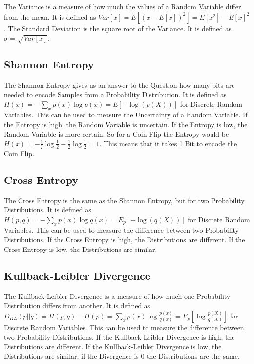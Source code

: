 \documentclass[a4paper]{article}
\begin{document}
The Variance is a measure of how much the values of a Random Variable differ from the mean. It is defined as $Var[x] = E[(x - E[x])^{2}] = E[x^{2}] - E[x]^{2}$.
The Standard Deviation is the square root of the Variance. It is defined as $\sigma = \sqrt{Var[x]}$.

\subsection{Shannon Entropy}

The Shannon Entropy gives us an answer to the Question how many bits are needed to encode Samples from a Probability Distribution. It is defined as $H(x) = - \sum_{x} p(x) \log p(x) = E[- \log(p(X))]$ for Discrete Random Variables. 
This can be used to measure the Uncertainty of a Random Variable. If the Entropy is high, the Random Variable is uncertain. If the Entropy is low, the Random Variable is more certain.
So for a Coin Flip the Entropy would be $H(x) = - \frac{1}{2} \log \frac{1}{2} - \frac{1}{2} \log \frac{1}{2} = 1$. This means that it takes 1 Bit to encode the Coin Flip. 

\subsection{Cross Entropy}

The Cross Entropy is the same as the Shannon Entropy, but for two Probability Distributions. It is defined as $H(p,q) = - \sum_{x} p(x) \log q(x) = E_p[- \log(q(X))]$ for Discrete Random Variables. This can be used to measure the difference between two Probability Distributions. If the Cross Entropy is high, the Distributions are different. If the Cross Entropy is low, the Distributions are similar.

\subsection{Kullback-Leibler Divergence}

The Kullback-Leibler Divergence is a measure of how much one Probability Distribution differs from another. It is defined as $D_{KL}(p||q) = H(p,q) - H(p) = \sum_{x} p(x) \log \frac{p(x)}{q(x)} = E_p[\log \frac{p(X)}{q(X)}]$ for Discrete Random Variables. This can be used to measure the difference between two Probability Distributions. If the Kullback-Leibler Divergence is high, the Distributions are different. If the Kullback-Leibler Divergence is low, the Distributions are similar, if the Divergence is 0 the Distributions are the same.
\end{document}
